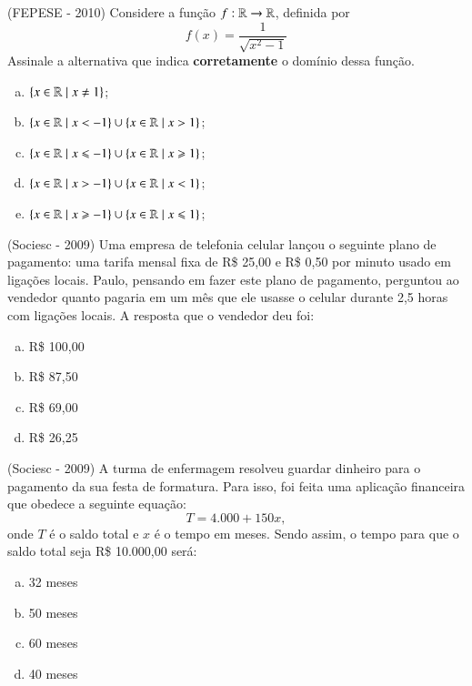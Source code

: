   \begin{exer}
  (FEPESE - 2010) Considere a função $f: \mathbb{R} \rightarrow \mathbb{R}$, definida por
\[f(x)= \frac{1}{\sqrt{x^2 - 1}}\]
Assinale a alternativa que indica \textbf{corretamente} o domínio dessa função.
\begin{enumerate}[a)]
\item $\{x \in \mathbb{R} \mid x \neq 1\}$;
\item $\{x \in \mathbb{R} \mid x < -1\} \cup \{x \in \mathbb{R} \mid x > 1\}$;
\item $\{x \in \mathbb{R} \mid x \leqslant -1\} \cup \{x \in \mathbb{R} \mid x \geqslant 1\}$;
\item $\{x \in \mathbb{R} \mid x > -1\} \cup \{x \in \mathbb{R} \mid x < 1\}$;
\item $\{x \in \mathbb{R} \mid x \geqslant -1\} \cup \{x \in \mathbb{R} \mid x \leqslant 1\}$;
\end{enumerate}
  \end{exer}
  
  \begin{exer}
  (Sociesc - 2009) Uma empresa de telefonia celular lançou o seguinte plano de pagamento: uma tarifa mensal fixa de R\$ 25,00 e R\$ 0,50 por minuto usado em ligações locais. Paulo, pensando em fazer este plano de pagamento, perguntou ao vendedor quanto pagaria em um mês que ele usasse o celular durante 2,5 horas com ligações locais. A resposta que o vendedor deu foi:
 \begin{enumerate}[a)]
  \item R\$ 100,00
  \item R\$ 87,50
  \item R\$ 69,00
  \item R\$ 26,25
 \end{enumerate}
  \end{exer}
  
  \begin{exer}
  (Sociesc - 2009) A turma de enfermagem resolveu guardar dinheiro para o pagamento da sua festa de formatura. Para isso, foi feita uma aplicação financeira que obedece a seguinte equação:
  \[T = 4.000 + 150x ,\]
  onde $T$ é o saldo total e $x$ é o tempo em meses. Sendo assim, o tempo para que o saldo total seja R\$ 10.000,00 será:
  \begin{enumerate}[a)]
  \item 32 meses
  \item 50 meses
  \item 60 meses
  \item 40 meses
 \end{enumerate}
  \end{exer}
  
